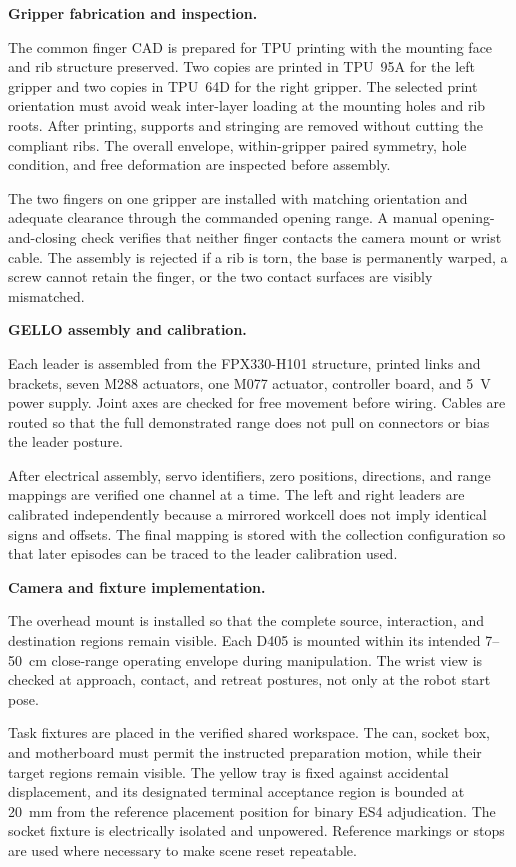 \medskip
\noindent\textbf{Gripper fabrication and inspection.}

The common finger CAD is prepared for TPU printing with the mounting face and rib structure preserved. Two copies are printed in TPU~95A for the left gripper and two copies in TPU~64D for the right gripper. The selected print orientation must avoid weak inter-layer loading at the mounting holes and rib roots. After printing, supports and stringing are removed without cutting the compliant ribs. The overall envelope, within-gripper paired symmetry, hole condition, and free deformation are inspected before assembly.

The two fingers on one gripper are installed with matching orientation and adequate clearance through the commanded opening range. A manual opening-and-closing check verifies that neither finger contacts the camera mount or wrist cable. The assembly is rejected if a rib is torn, the base is permanently warped, a screw cannot retain the finger, or the two contact surfaces are visibly mismatched.

\medskip
\noindent\textbf{GELLO assembly and calibration.}

Each leader is assembled from the FPX330-H101 structure, printed links and brackets, seven M288 actuators, one M077 actuator, controller board, and 5~V power supply. Joint axes are checked for free movement before wiring. Cables are routed so that the full demonstrated range does not pull on connectors or bias the leader posture.

After electrical assembly, servo identifiers, zero positions, directions, and range mappings are verified one channel at a time. The left and right leaders are calibrated independently because a mirrored workcell does not imply identical signs and offsets. The final mapping is stored with the collection configuration so that later episodes can be traced to the leader calibration used.

\medskip
\noindent\textbf{Camera and fixture implementation.}

The overhead mount is installed so that the complete source, interaction, and destination regions remain visible. Each D405 is mounted within its intended 7--50~cm close-range operating envelope during manipulation. The wrist view is checked at approach, contact, and retreat postures, not only at the robot start pose.

Task fixtures are placed in the verified shared workspace. The can, socket box, and motherboard must permit the instructed preparation motion, while their target regions remain visible. The yellow tray is fixed against accidental displacement, and its designated terminal acceptance region is bounded at 20~mm from the reference placement position for binary ES4 adjudication. The socket fixture is electrically isolated and unpowered. Reference markings or stops are used where necessary to make scene reset repeatable.

